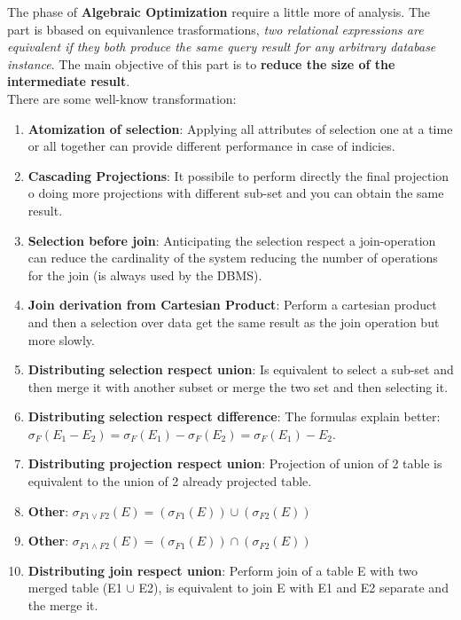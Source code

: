 \documentclass[12pt]{article}
\begin{document}
The phase of \textbf{Algebraic Optimization} require a little more of analysis. The part is bbased on equivanlence trasformations, \textit{two relational expressions are equivalent if they both produce the same query result for any arbitrary database instance}. The main objective of this part is to \textbf{reduce the size of the intermediate result}.\\
There are some well-know transformation:
\begin{enumerate}
  \item \textbf{Atomization of selection}: Applying all attributes of selection one at a time or all together can provide different performance in case of indicies.
  \item \textbf{Cascading Projections}: It possibile to perform directly the final projection o doing more projections with different sub-set and you can obtain the same result.
  \item \textbf{Selection before join}: Anticipating the selection respect a join-operation can reduce the cardinality of the system reducing the number of operations for the join (is always used by the DBMS).
  \item \textbf{Join derivation from Cartesian Product}: Perform a cartesian product and then a selection over data get the same result as the join operation but more slowly.
  \item \textbf{Distributing selection respect union}: Is equivalent to select a sub-set and then merge it with another subset or merge the two set and then selecting it.
  \item \textbf{Distributing selection respect difference}: The formulas explain better: $\sigma_{F}(E_1 - E_2) = \sigma_{F}(E_1) - \sigma_{F}(E_2) = \sigma_{F}(E_1) - E_2 $.
  \item \textbf{Distributing projection respect union}: Projection of union of 2 table is equivalent to the union of 2 already projected table.
  \item \textbf{Other}: $\sigma_{F1 \vee F2}(E) = (\sigma_{F1}(E)) \cup (\sigma_{F2}(E))$
  \item \textbf{Other}: $\sigma_{F1 \wedge F2}(E) = (\sigma_{F1}(E)) \cap (\sigma_{F2}(E))$
  \item \textbf{Distributing join respect union}: Perform join of a table E with two merged table (E1 $\cup$ E2), is equivalent to join E with E1 and E2 separate and the merge it.
\end{enumerate}
\end{document}
